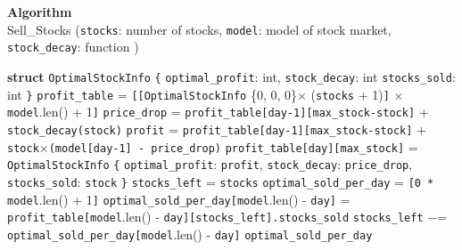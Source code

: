 \documentclass[12pt]{article}
\begin{document}
\begin{algorithm}
  \caption*{\textbf{Algorithm}\\Sell\_Stocks \big(\texttt{stocks}: number of stocks, \texttt{model}: model of stock market, \texttt{stock\_decay}: function \big)}\label{alg:cap}
	\begin{algorithmic}[1]
    \State \textbf{struct} \texttt{OptimalStockInfo} \texttt{\{} \Indent
      \State \texttt{optimal\_profit}: int,
      \State \texttt{stock\_decay}: int
      \State \texttt{stocks\_sold}: int
    \EndIndent \State \texttt{\}}
    \State
    \State \texttt{profit\_table} = \texttt{[[}\texttt{OptimalStockInfo} \{0, 0, 0\}$\times$ (\texttt{stocks} + 1)\texttt{]} $\times$ \texttt{model}.len() + 1\texttt{]}
    \State
          \State \texttt{price\_drop} = \texttt{profit\_table[day-1][max\_stock-stock]} + \texttt{stock\_decay(stock)}
          \State \texttt{profit} = \texttt{profit\_table[day-1][max\_stock-stock]} +
          \State \hspace*{30mm} \texttt{stock}$\times$\texttt{(model[day-1] - price\_drop)}
          \State
            \State \texttt{profit\_table[day][max\_stock]} = \texttt{OptimalStockInfo} \texttt{\{} \Indent
              \State \texttt{optimal\_profit}: \texttt{profit},
              \State \texttt{stock\_decay}: \texttt{price\_drop},
              \State \texttt{stocks\_sold}: \texttt{stock}
            \EndIndent \State \texttt{\}}
          \EndIf
        \EndFor
      \EndFor
    \EndFor
    \State
    \State \texttt{stocks\_left} = \texttt{stocks}
    \State \texttt{optimal\_sold\_per\_day} = \texttt{[0 * model}.len() + 1\texttt{]}
      \State \texttt{optimal\_sold\_per\_day[model}.len() - \texttt{day]} =
      \State \hspace*{30mm} \texttt{profit\_table[model}.len() - \texttt{day][stocks\_left].stocks\_sold}
      \State \texttt{stocks\_left} $-$= \texttt{optimal\_sold\_per\_day[model}.len() - \texttt{day]}
    \EndFor
    \State
    \State\Return \texttt{optimal\_sold\_per\_day}
	\end{algorithmic}
\end{algorithm}
\end{document}
